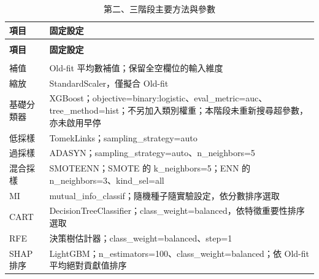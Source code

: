 \begingroup
\footnotesize
{}
\setlength{\tabcolsep}{4pt}
\renewcommand{\arraystretch}{1.25}
\setlength{\LTleft}{0pt plus 1fill}
\setlength{\LTright}{0pt plus 1fill}
\begin{longtable}{@{}>{\raggedright\arraybackslash}p{}>{\raggedright\arraybackslash}p{}@{}}
\caption{第二、三階段主要方法與參數}\label{tab:method-parameters}\\
\toprule
\textbf{項目} & \textbf{固定設定} \\
\midrule
\endfirsthead
\multicolumn{2}{c}{表~\thetable（續）}\\
\toprule
\textbf{項目} & \textbf{固定設定} \\
\midrule
\endhead
\midrule
\multicolumn{2}{r}{續下頁}\\
\endfoot
\bottomrule
\endlastfoot
補值 & Old-fit 平均數補值；保留全空欄位的輸入維度 \\
\addlinespace[2pt]
縮放 & StandardScaler，僅擬合 Old-fit \\
\addlinespace[2pt]
基礎分類器 & XGBoost；{\normalfont objective=\allowbreak{}binary:logistic}、{\normalfont eval\_\allowbreak{}metric=\allowbreak{}auc}、{\normalfont tree\_\allowbreak{}method=\allowbreak{}hist}；不另加入類別權重；本階段未重新搜尋超參數，亦未啟用早停 \\
\addlinespace[2pt]
低採樣 & TomekLinks；{\normalfont sampling\_\allowbreak{}strategy=\allowbreak{}auto} \\
\addlinespace[2pt]
過採樣 & ADASYN；{\normalfont sampling\_\allowbreak{}strategy=\allowbreak{}auto}、{\normalfont n\_\allowbreak{}neighbors=\allowbreak{}5} \\
\addlinespace[2pt]
混合採樣 & SMOTEENN；SMOTE 的 {\normalfont k\_\allowbreak{}neighbors=\allowbreak{}5}；ENN 的 {\normalfont n\_\allowbreak{}neighbors=\allowbreak{}3}、{\normalfont kind\_\allowbreak{}sel=\allowbreak{}all} \\
\addlinespace[2pt]
MI & {\normalfont mutual\_\allowbreak{}info\_\allowbreak{}classif}；隨機種子隨實驗設定，依分數排序選取 \\
\addlinespace[2pt]
CART & DecisionTreeClassifier；{\normalfont class\_\allowbreak{}weight=\allowbreak{}balanced}，依特徵重要性排序選取 \\
\addlinespace[2pt]
RFE & 決策樹估計器；{\normalfont class\_\allowbreak{}weight=\allowbreak{}balanced}、{\normalfont step=\allowbreak{}1} \\
\addlinespace[2pt]
SHAP 排序 & LightGBM；{\normalfont n\_\allowbreak{}estimators=\allowbreak{}100}、{\normalfont class\_\allowbreak{}weight=\allowbreak{}balanced}；依 Old-fit 平均絕對貢獻值排序 \\

\end{longtable}
